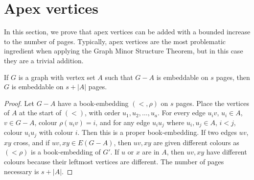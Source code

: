 \section{Apex vertices}
In this section, we prove that apex vertices can be added with a bounded increase to the number of pages. Typically, apex vertices are the most problematic ingredient when applying the Graph Minor Structure Theorem, but in this case they are a trivial addition.
\begin{theorem}\label{thm:apex_vertices_pagenumber}
	If \(G\) is a graph with vertex set \(A\) such that \(G - A\) is embeddable on $s$ pages, then \(G\) is embeddable on \(s + |A| \) pages.
\end{theorem}
\begin{proof}
	Let \(G - A\) have a book-embedding \((<, \rho)\) on $s$ pages. Place the vertices of \(A\) at the start of \((<)\), with order $u_1, u_2, \ldots, u_a$. For every edge \(u_i v \), \(u_i \in A\), \(v \in G - A\), colour \(\rho(u_i v) = i\), and for any edge \(u_i u_j\) where $u_i, u_j \in A$, $i < j$, colour $u_i u_j$ with colour $i$. Then this is a proper book-embedding. If two edges $uv$, $xy$ cross, and if $uv, xy \in E(G - A)$, then $uv, xy$ are given different colours as $(< \rho)$ is a book-embedding of $G'$. If $u$ or $x$ are in $A$, then $uv, xy$ have different colours because their leftmost vertices are different. The number of pages necessary is $s + |A|$. 
\end{proof}